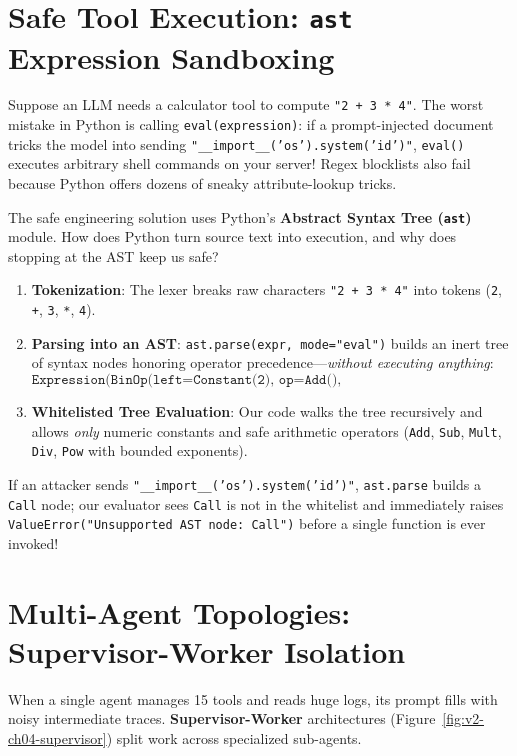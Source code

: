 \section{Safe Tool Execution: \texttt{ast} Expression Sandboxing}

Suppose an LLM needs a calculator tool to compute \texttt{"2 + 3 * 4"}. The worst mistake in Python is calling \texttt{eval(expression)}: if a prompt-injected document tricks the model into sending \texttt{"\_\_import\_\_('os').system('id')"}, \texttt{eval()} executes arbitrary shell commands on your server! Regex blocklists also fail because Python offers dozens of sneaky attribute-lookup tricks.

The safe engineering solution uses Python's \textbf{Abstract Syntax Tree (\texttt{ast})} module. How does Python turn source text into execution, and why does stopping at the AST keep us safe?
\begin{enumerate}[leftmargin=18pt]
  \item \textbf{Tokenization}: The lexer breaks raw characters \texttt{"2 + 3 * 4"} into tokens (\texttt{2}, \texttt{+}, \texttt{3}, \texttt{*}, \texttt{4}).
  \item \textbf{Parsing into an AST}: \texttt{ast.parse(expr, mode="eval")} builds an inert tree of syntax nodes honoring operator precedence—\emph{without executing anything}:
  \[
  \texttt{Expression(BinOp(left=Constant(2), op=Add(), right=BinOp(Constant(3), Mult(), Constant(4))))}
  \]
  \item \textbf{Whitelisted Tree Evaluation}: Our code walks the tree recursively and allows \emph{only} numeric constants and safe arithmetic operators (\texttt{Add}, \texttt{Sub}, \texttt{Mult}, \texttt{Div}, \texttt{Pow} with bounded exponents).
\end{enumerate}
If an attacker sends \texttt{"\_\_import\_\_('os').system('id')"}, \texttt{ast.parse} builds a \texttt{Call} node; our evaluator sees \texttt{Call} is not in the whitelist and immediately raises \texttt{ValueError("Unsupported AST node: Call")} before a single function is ever invoked!

\section{Multi-Agent Topologies: Supervisor-Worker Isolation}

When a single agent manages 15 tools and reads huge logs, its prompt fills with noisy intermediate traces. \textbf{Supervisor-Worker} architectures (Figure~\ref{fig:v2-ch04-supervisor}) split work across specialized sub-agents.

